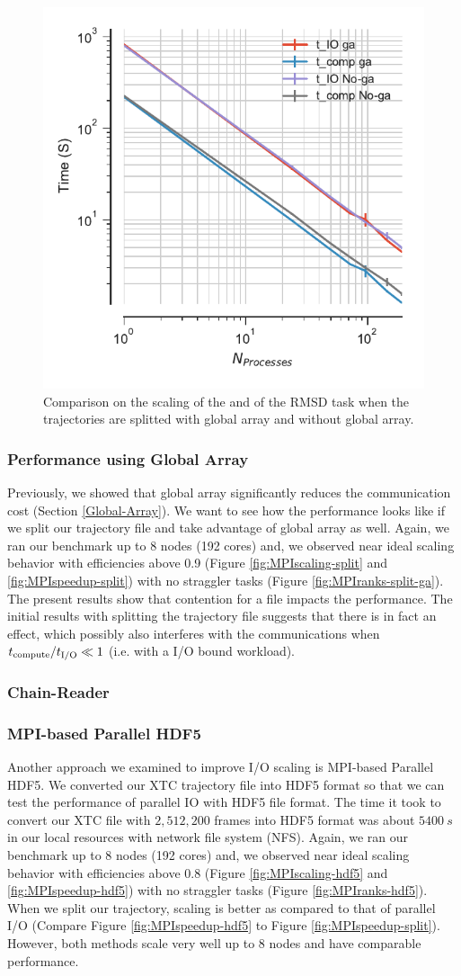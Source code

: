 \begin{figure}[ht!]
\centering
  \includegraphics[width=0.4\linewidth]{figures/Comparison_IO_compute_scaling_traj_splitting.pdf}
\caption{Comparison on the scaling of the \tcomp and \tIO of the RMSD task when the trajectories are splitted with global array and without global array.}
\label{fig:ScalingComputeIO-split}
\end{figure}

\subsubsection*{Performance using Global Array}
Previously, we showed that global array significantly reduces the communication cost (Section \ref{Global-Array}). 
We want to see how the performance looks like if we split our trajectory file and take advantage of global array as well.
Again, we ran our benchmark up to 8 nodes (192 cores) and, we observed near ideal scaling behavior with efficiencies above 0.9 (Figure \ref{fig:MPIscaling-split} and \ref{fig:MPIspeedup-split}) with no straggler tasks (Figure \ref{fig:MPIranks-split-ga}).  
The present results show that contention for a file impacts the performance. 
The initial results with splitting the trajectory file suggests that there is in fact an effect, which possibly also interferes with the communications when ${t}_{\text{compute}}/{t}_{\text{I/O}} \ll 1$ (i.e. with a I/O bound workload).

\subsubsection{Chain-Reader}

\subsubsection{MPI-based Parallel HDF5}
\label{HDF5}
Another approach we examined to improve I/O scaling is MPI-based Parallel HDF5. 
We converted our XTC trajectory file into HDF5 format so that we can test the performance of parallel IO with HDF5 file format.
The time it took to convert our XTC file with $2,512,200$ frames into HDF5 format was about $5400~s$ in our local resources with network file system (NFS).
Again, we ran our benchmark up to 8 nodes (192 cores) and, we observed near ideal scaling behavior with efficiencies above 0.8 (Figure \ref{fig:MPIscaling-hdf5} and \ref{fig:MPIspeedup-hdf5}) with no straggler tasks (Figure \ref{fig:MPIranks-hdf5}).  
When we split our trajectory, scaling is better as compared to that of parallel I/O (Compare Figure \ref{fig:MPIspeedup-hdf5} to Figure \ref{fig:MPIspeedup-split}). 
However, both methods scale very well up to 8 nodes and have comparable performance.  


